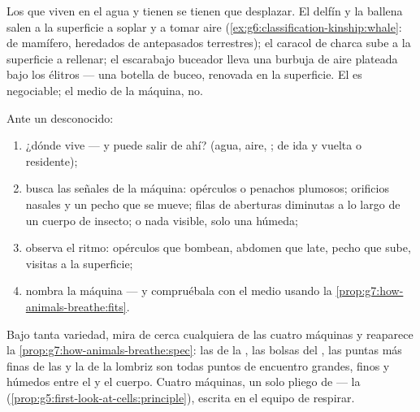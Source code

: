 \begin{example}\label{ex:g7:how-animals-breathe:airinwater}
Los que viven en el agua y tienen  se tienen que desplazar. El
delfín y la ballena salen a la superficie a soplar y a tomar aire
(\cref{ex:g6:classification-kinship:whale}:  de mamífero,
heredados de antepasados terrestres); el caracol de charca sube a la
superficie a rellenar; el escarabajo buceador lleva una burbuja de aire
plateada bajo los élitros --- una botella de buceo, renovada en la
superficie. El  es negociable; el medio de la máquina, no.
\end{example}

\begin{method}\label{met:g7:how-animals-breathe:read}
Ante un  desconocido:
\begin{enumerate}
  \item ¿dónde vive --- y puede salir de ahí? (agua, aire, ; de
        ida y vuelta o residente);
  \item busca las señales de la máquina: opérculos o penachos plumosos;
        orificios nasales y un pecho que se mueve; filas de aberturas
        diminutas a lo largo de un cuerpo de insecto; o nada visible,
        solo una  húmeda;
  \item observa el ritmo: opérculos que bombean, abdomen que late,
        pecho que sube, visitas a la superficie;
  \item nombra la máquina --- y compruébala con el medio usando la
        \cref{prop:g7:how-animals-breathe:fits}.
\end{enumerate}
\end{method}

\begin{remark}\label{rem:g7:how-animals-breathe:same}
Bajo tanta variedad, mira de cerca cualquiera de las cuatro máquinas y
reaparece la \cref{prop:g7:how-animals-breathe:spec}: las  de la
, las bolsas del , las puntas más finas de las  y
la  de la lombriz son todas puntos de encuentro grandes, finos y
húmedos entre el  y el cuerpo. Cuatro máquinas, un solo pliego
de  --- la 
(\cref{prop:g5:first-look-at-cells:principle}), escrita en el equipo de
respirar.
\end{remark}

